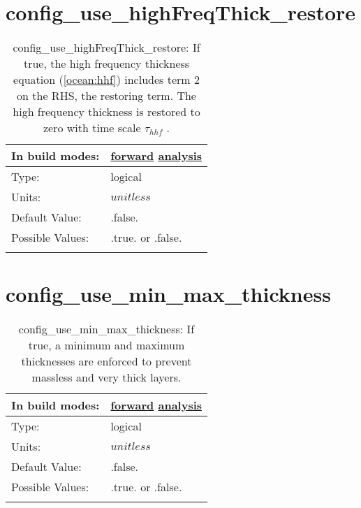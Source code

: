 \section[config\_use\_highFreqThick\_restore]{config\_use\_highFreqThick\_restore}
\label{sec:nm_sec_config_use_highFreqThick_restore}
\begin{center}
\begin{longtable}{| p{2.0in} || p{4.0in} |}
    \hline
    In build modes: & \hyperref[subsec:forward_nm_tab_ALE_frequency_filtered_thickness]{forward} \hyperref[subsec:analysis_nm_tab_ALE_frequency_filtered_thickness]{analysis} \\
    \hline
    Type: & logical \\
    \hline
    Units: & $unitless$ \\
    \hline
    Default Value: & .false. \\
    \hline
    Possible Values: & .true. or .false. \\
    \hline
    \caption{config\_use\_highFreqThick\_restore:  If true, the high frequency thickness equation (\ref{ocean:hhf}) includes term 2 on the RHS, the restoring term.  The high frequency thickness is restored to zero with time scale  $\tau_{hhf}$ .}
\end{longtable}
\end{center}
\section[config\_use\_min\_max\_thickness]{config\_use\_min\_max\_thickness}
\label{sec:nm_sec_config_use_min_max_thickness}
\begin{center}
\begin{longtable}{| p{2.0in} || p{4.0in} |}
    \hline
    In build modes: & \hyperref[subsec:forward_nm_tab_ALE_vertical_grid]{forward} \hyperref[subsec:analysis_nm_tab_ALE_vertical_grid]{analysis} \\
    \hline
    Type: & logical \\
    \hline
    Units: & $unitless$ \\
    \hline
    Default Value: & .false. \\
    \hline
    Possible Values: & .true. or .false. \\
    \hline
    \caption{config\_use\_min\_max\_thickness: If true, a minimum and maximum thicknesses are enforced to prevent massless and very thick layers.}
\end{longtable}
\end{center}
